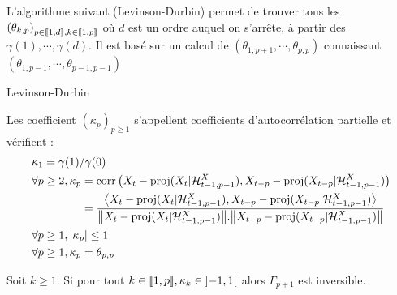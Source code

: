 \documentclass{report}
\begin{document}
L'algorithme suivant (Levinson-Durbin) permet de trouver tous les $\left( \theta_{k,p} \right)_{p \in {\left\llbracket 1,d \right\rrbracket}, k\in {\left\llbracket 1,p \right\rrbracket}}$ où $d$ est un ordre auquel on s'arrête, à partir des $\gamma(1),\cdots, \gamma(d)$. Il est basé sur un calcul de $(\theta_{1,p+1}, \cdots, \theta_{p,p})$ connaissant $(\theta_{1,p-1}, \cdots, \theta_{p-1,p-1})$\\
\begin{algorithm}[H]
 \caption{Levinson-Durbin}
 \label{algo:levinson}
\end{algorithm}
\begin{Prop}
Les coefficient $(\kappa_p)_{p\geq 1}$ s'appellent coefficients d'autocorrélation partielle et vérifient :
\begin{align*}
&\kappa_1 = \gamma(1) / \gamma(0) \\
&\begin{aligned}
\forall p \geq 2, \kappa_p &= \mathrm{corr} \left( X_t - \mathop{\rm proj}\nolimits(X_t | \mathcal{H}^X_{t-1,p-1}), X_{t-p} - \mathop{\rm proj}\nolimits(X_{t-p} | \mathcal{H}^X_{t-1,p-1}) \right) \\
&= \frac{{ \left\langle X_t - \mathop{\rm proj}\nolimits(X_t | \mathcal{H}^X_{t-1,p-1}), X_{t-p} - \mathop{\rm proj}\nolimits(X_{t-p} | \mathcal{H}^X_{t-1,p-1}) \right\rangle}}{{ \left\| X_t - \mathop{\rm proj}\nolimits(X_t | \mathcal{H}^X_{t-1,p-1}) \right\|} . { \left\| X_{t-p} - \mathop{\rm proj}\nolimits(X_{t-p} | \mathcal{H}^X_{t-1,p-1}) \right\|}}
\end{aligned} \\
&\forall p\geq 1, { \left| \kappa_p \right|} \leq 1 \\
&\forall p\geq 1, \kappa_p = \theta_{p,p}
\end{align*}
\end{Prop}
\begin{Prop}\label{prop:Gamma_inv}
Soit $k\geq 1$. Si pour tout $k\in {\left\llbracket 1,p \right\rrbracket}, \kappa_k \in {\left] -1,1 \right[}$ alors $\Gamma_{p+1}$ est inversible.
\end{Prop}
\end{document}
